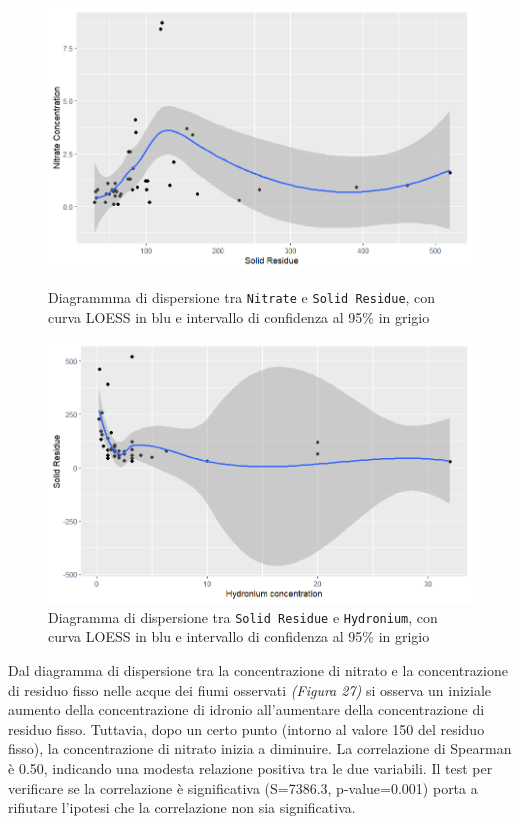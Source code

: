 \documentclass{article} %
\begin{document}
\begin{figure}[H]
    \centering
    \begin{minipage}{0.49\textwidth}
        \centering
        \includegraphics[width=\textwidth]{immagini/sr_nitrate.png}
        \captionsetup{justification=centering}
        \caption{Diagrammma di dispersione tra \texttt{Nitrate} e \texttt{Solid Residue}, con curva LOESS in blu e intervallo di confidenza al 95\% in grigio}
    \end{minipage}
    \hfill
    \begin{minipage}{0.49\textwidth}
        \centering
        \includegraphics[width=\textwidth]{immagini/sr_hy.png}
        \captionsetup{justification=centering}
        \caption{Diagramma di dispersione tra \texttt{Solid Residue} e \texttt{Hydronium}, con curva LOESS in blu e intervallo di confidenza al 95\% in grigio}
    \end{minipage}
\end{figure}

Dal diagramma di dispersione tra la concentrazione di nitrato e la concentrazione di residuo fisso nelle acque dei fiumi osservati \textit{(Figura 27)} si osserva un iniziale aumento della concentrazione di idronio all'aumentare della concentrazione di residuo fisso. Tuttavia, dopo un certo punto (intorno al valore 150 del residuo fisso), la concentrazione di nitrato inizia a diminuire.
La correlazione di Spearman è 0.50, indicando una modesta relazione positiva tra le due variabili. 
Il test per verificare se la correlazione è significativa (S=7386.3, p-value=0.001) porta a rifiutare l'ipotesi che la correlazione non sia significativa.
\end{document}
